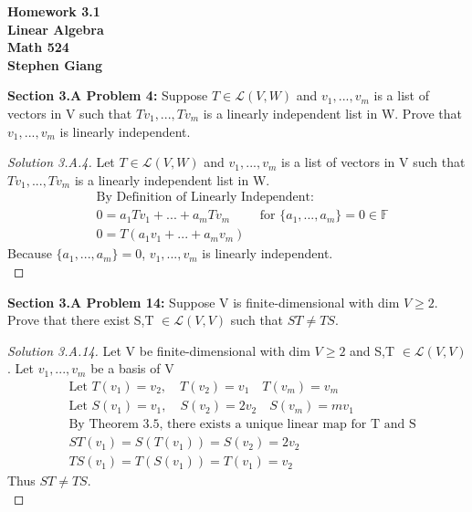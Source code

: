 \documentclass[12pt]{article}
\begin{document}
	
	\begin{center}
		\textbf{Homework 3.1} \\
		\textbf{Linear Algebra} \\
		\textbf{Math 524} \\
		\textbf{Stephen Giang} \\
	\end{center}

\textbf{Section 3.A Problem 4: } Suppose $T \in \mathcal{L}(V,W)$ and $v_1, ..., v_m$ is a list of vectors in V such that $Tv_1, ..., Tv_m $ is a linearly independent list in W. Prove that $v_1, ..., v_m$ is linearly independent.

	\begin{proof}[Solution 3.A.4]
		Let $T \in \mathcal{L}(V,W)$ and $v_1, ..., v_m$ is a list of vectors in V such that $Tv_1, ..., Tv_m $ is a linearly independent list in W.
		\begin{align*}
			&\text{By Definition of Linearly Independent: } \\
			& 0 = a_1Tv_1 + ... + a_mTv_m \qquad \text{ for } \{a_1, ..., a_m\} = 0 \in \mathbb{F} \\
			& 0 = T (a_1v_1 + ... + a_mv_m)
		\end{align*}
		Because $\{a_1, ..., a_m\} = 0$, $v_1, ..., v_m$ is linearly independent. \\
	\end{proof}

\vspace{\baselineskip}
\textbf{Section 3.A Problem 14: } Suppose V is finite-dimensional with dim $V \geq 2$. Prove that there exist
S,T $\in \mathcal{L}(V,V)$ such that $ST \not = TS$.

	\begin{proof}[Solution 3.A.14]
		Let V be finite-dimensional with dim $V \geq 2$ and S,T $\in \mathcal{L}(V,V)$. Let $v_1, ..., v_m$ be a basis of V
		\begin{align*}
			&\text{Let } T(v_1) = v_2, \quad T(v_2) = v_1 \quad T(v_m) = v_{m}\\
			&\text{Let } S(v_1) = v_1,\quad S(v_2) = 2v_2 \quad S(v_m) = mv_1 \\
			&\text{By Theorem 3.5, there exists a unique linear map for T and S} \\
			& ST(v_1) = S(T(v_1)) = S(v_2) = 2v_2 \\
			& TS(v_1) = T(S(v_1)) = T(v_1) = v_2 
		\end{align*}
		Thus $ST \not = TS$. \\
	\end{proof}
\end{document}
